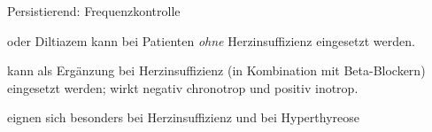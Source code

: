 
% 
% 
% 
% 
% 
% 
%   

\TextSlide
{}%
{}%
{}%

Persistierend:
  Frequenzkontrolle
  

 oder Diltiazem kann bei Patienten \emph{ohne}
Herzinsuffizienz eingesetzt werden. 

 kann als Ergänzung bei
Herzinsuffizienz (in Kombination mit Beta-Blockern) eingesetzt werden; wirkt
negativ chronotrop und positiv inotrop.

 eignen sich besonders bei
Herzinsuffizienz und bei Hyperthyreose



\TextSlide
{}%
{}%
{}%




